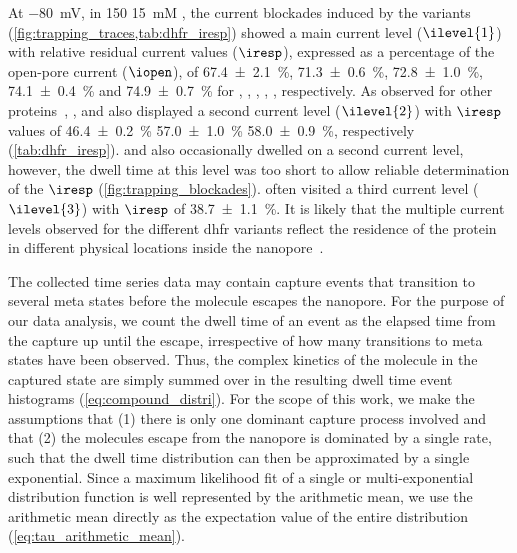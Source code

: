 At \SI{-80}{\mV}, in \SI{150}{\mM}  \SI{15}{mM}  , the current blockades induced
by the  variants (\cref{fig:trapping_traces,tab:dhfr_iresp}) showed a main current level
($\ilevel{1}$) with relative residual current values ($\iresp$), expressed as a percentage of the open-pore
current ($\iopen$), of \SI{67.4 \pm 2.1}{\percent}, \SI{71.3 \pm 0.6}{\percent}, \SI{72.8 \pm 1.0}{\percent},
\SI{74.1 \pm 0.4}{\percent} and \SI{74.9 \pm 0.7}{\percent} for , , ,
, , respectively. As observed for other proteins~\cite{Soskine-2012,Soskine-2013,
Soskine-Biesemans-2015,Biesemans-2015}, ,  and  also displayed a second
current level ($\ilevel{2}$) with $\iresp$ values of \SI{46.4 \pm 0.2}{\percent} \SI{57.0 \pm 1.0}{\percent}
\SI{58.0 \pm 0.9}{\percent}, respectively (\cref{tab:dhfr_iresp}).  and  also
occasionally dwelled on a second current level, however, the dwell time at this level was too short to allow
reliable determination of the $\iresp$ (\cref{fig:trapping_blockades}).  often visited a third
current level ($\ilevel{3}$) with $\iresp$ of \SI{38.7\pm 1.1}{\percent}. It is likely that the multiple
current levels observed for the different \gls{dhfr} variants reflect the residence of the protein in
different physical locations inside the nanopore~\cite{Soskine-2012}.

The collected time series data may contain capture events that transition to several meta states before the
molecule escapes the nanopore. For the purpose of our data analysis, we count the dwell time of an event as
the elapsed time from the capture up until the escape, irrespective of how many transitions to meta states
have been observed. Thus, the complex kinetics of the molecule in the captured state are simply summed over in
the resulting dwell time event histograms (\cref{eq:compound_distri}). For the scope of this work, we make the
assumptions that (1) there is only one dominant capture process involved and that (2) the molecules escape
from the nanopore is dominated by a single rate, such that the dwell time distribution can then be
approximated by a single exponential. Since a maximum likelihood fit of a single or multi-exponential
distribution function is well represented by the arithmetic mean, we use the arithmetic mean directly as the
expectation value of the entire distribution (\cref{eq:tau_arithmetic_mean}).



